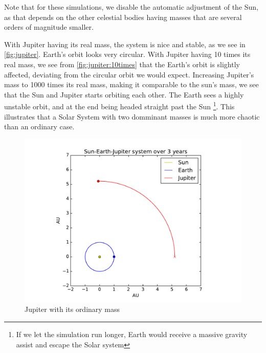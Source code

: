 \documentclass[a4paper]{article}
\begin{document}
Note that for these simulations, we disable the automatic adjustment of the Sun, as that depends on the other celestial bodies having masses that are several orders of magnitude smaller.

With Jupiter having its real mass, the system is nice and stable, as we see in \vref{fig:jupiter}. Earth's orbit looks very circular.
With Jupiter having 10 times its real mass, we see from \vref{fig:jupiter:10times} that the Earth's orbit is slightly affected, deviating from the circular orbit we would expect. Increasing Jupiter's mass to 1000 times its real mass, making it comparable to the sun's mass, we see that the Sun and Jupiter starts orbiting each other. The Earth sees a highly unstable orbit, and at the end being headed straight past the Sun \footnote{If we let the simulation run longer, Earth would receive a massive gravity assist and escape the Solar system}. This illustrates that a Solar System with two domminant masses is much more chaotic than an ordinary case.

\begin{figure}[htb]
\includegraphics[width=\textwidth]{fig/jupitermass_1.pdf}
\caption{Jupiter with its ordinary mass}
\label{fig:jupiter}
\end{figure}
\end{document}
